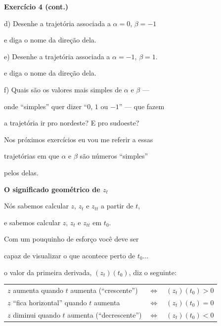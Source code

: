 \documentclass[oneside,12pt]{article}
\begin{document}
\newpage

{\bf Exercício 4 (cont.)}

\ssk

d) Desenhe a trajetória associada a $α=0$, $β=-1$

e diga o nome da direção dela.

\ssk

e) Desenhe a trajetória associada a $α=-1$, $β=1$.

e diga o nome da direção dela.

\ssk

f) Quais são os valores mais simples de $α$ e $β$ ---

onde ``simples'' quer dizer ``$0$, $1$ ou $-1$'' --- que fazem

a trajetória ir pro nordeste? E pro sudoeste?

\bsk
\bsk

Nos próximos exercícios eu vou me referir a essas

trajetórias em que $α$ e $β$ são números ``simples''

pelos  delas.


\newpage


{\bf O significado geométrico de $z_t$}

Nós sabemos calcular $z$, $z_t$ e $z_{tt}$ a partir de $t$,

e sabemos calcular $z$, $z_t$ e $z_{tt}$ em $t_0$.

\ssk

Com um pouquinho de esforço você deve ser

capaz de visualizar o que acontece perto de $t_0$...

o valor da primeira derivada, $(z_t)(t_0)$, diz o seguinte:

\def\LR{$\Longleftrightarrow$}

\msk

\begin{tabular}{lll}
$z$ aumenta quando $t$ aumenta (``crescente'')   &\LR& $(z_t)(t_0)>0$ \\
$z$ ``fica horizontal'' quando $t$ aumenta       &\LR& $(z_t)(t_0)=0$ \\
$z$ diminui quando $t$ aumenta (``decrescente'') &\LR& $(z_t)(t_0)<0$ \\
\end{tabular}
\end{document}
